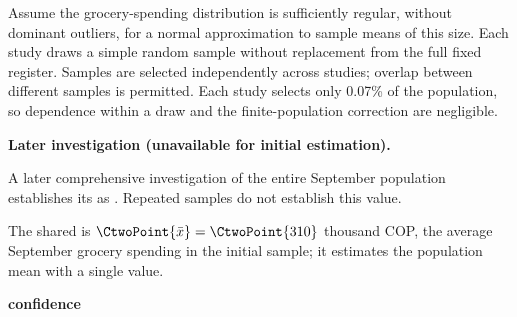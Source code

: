 \begin{probleminfoexcerpt}
Assume the grocery-spending distribution is sufficiently regular, without dominant outliers, for a normal approximation to sample means of this size. Each study draws a simple random sample without replacement from the full fixed register. Samples are selected independently across studies; overlap between different samples is permitted. Each study selects only 0.07\% of the population, so dependence within a draw and the finite-population correction are negligible.
\end{probleminfoexcerpt}

\textbf{Later investigation (unavailable for initial estimation).}

\begin{probleminfoexcerpt}
A later comprehensive investigation of the entire September population establishes its   as   . Repeated samples do not establish this value.
\end{probleminfoexcerpt}

The shared  is $\CtwoPoint{\bar x}=\CtwoPoint{310}$ thousand COP, the average September grocery spending in the initial sample; it estimates the population mean with a single value.

\textbf{ confidence}




